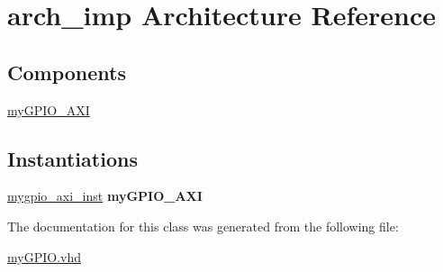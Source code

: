\hypertarget{classmy_g_p_i_o_1_1arch__imp}{\section{arch\+\_\+imp Architecture Reference}
\label{classmy_g_p_i_o_1_1arch__imp}
}
\subsection*{Components}
 \begin{DoxyCompactItemize}
\item 
\hypertarget{classmy_g_p_i_o_1_1arch__imp_ga8572f9bcbafb11ba88eb27767f55e60d}{\hyperlink{group__my_g_p_i_o_ga8572f9bcbafb11ba88eb27767f55e60d}{my\+G\+P\+I\+O\+\_\+\+A\+X\+I}  {\bfseries }  }\label{classmy_g_p_i_o_1_1arch__imp_ga8572f9bcbafb11ba88eb27767f55e60d}

\end{DoxyCompactItemize}
\subsection*{Instantiations}
 \begin{DoxyCompactItemize}
\item 
\hypertarget{classmy_g_p_i_o_1_1arch__imp_a62460b5cb7e240a959d9fce67d8041be}{\hyperlink{classmy_g_p_i_o_1_1arch__imp_a62460b5cb7e240a959d9fce67d8041be}{mygpio\+\_\+axi\+\_\+inst}  {\bfseries my\+G\+P\+I\+O\+\_\+\+A\+X\+I}   }\label{classmy_g_p_i_o_1_1arch__imp_a62460b5cb7e240a959d9fce67d8041be}

\end{DoxyCompactItemize}


The documentation for this class was generated from the following file\+:\begin{DoxyCompactItemize}
\item 
\hyperlink{my_g_p_i_o_8vhd}{my\+G\+P\+I\+O.\+vhd}\end{DoxyCompactItemize}
